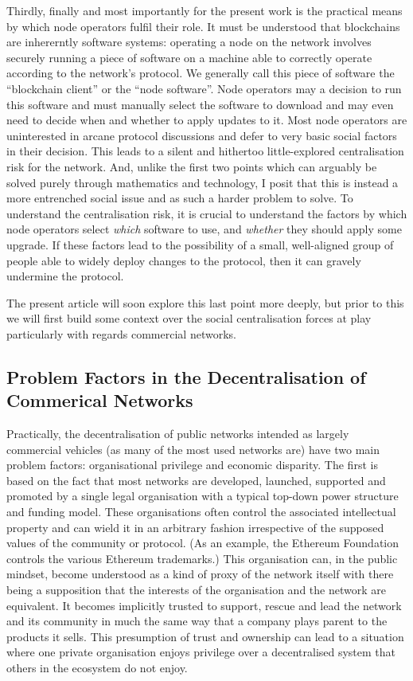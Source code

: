 \documentclass[9pt,oneside]{amsart}
\begin{document}
Thirdly, finally and most importantly for the present work is the practical means by which node operators fulfil their role. It must be understood that blockchains are inhererntly software systems: operating a node on the network involves securely running a piece of software on a machine able to correctly operate according to the network's protocol. We generally call this piece of software the ``blockchain client'' or the ``node software''. Node operators may a decision to run this software and must manually select the software to download and may even need to decide when and whether to apply updates to it. Most node operators are uninterested in arcane protocol discussions and defer to very basic social factors in their decision. This leads to a silent and hithertoo little-explored centralisation risk for the network. And, unlike the first two points which can arguably be solved purely through mathematics and technology, I posit that this is instead a more entrenched social issue and as such a harder problem to solve. To understand the centralisation risk, it is crucial to understand the factors by which node operators select \emph{which} software to use, and \emph{whether} they should apply some upgrade. If these factors lead to the possibility of a small, well-aligned group of people able to widely deploy changes to the protocol, then it can gravely undermine the protocol.

The present article will soon explore this last point more deeply, but prior to this we will first build some context over the social centralisation forces at play particularly with regards commercial networks.

\subsection{Problem Factors in the Decentralisation of Commerical Networks}

Practically, the decentralisation of public networks intended as largely commercial vehicles (as many of the most used networks are) have two main problem factors: organisational privilege and economic disparity. The first is based on the fact that most networks are developed, launched, supported and promoted by a single legal organisation with a typical top-down power structure and funding model. These organisations often control the associated intellectual property and can wield it in an arbitrary fashion irrespective of the supposed values of the community or protocol. (As an example, the Ethereum Foundation controls the various Ethereum trademarks.) This organisation can, in the public mindset, become understood as a kind of proxy of the network itself with there being a supposition that the interests of the organisation and the network are equivalent. It becomes implicitly trusted to support, rescue and lead the network and its community in much the same way that a company plays parent to the products it sells. This presumption of trust and ownership can lead to a situation where one private organisation enjoys privilege over a decentralised system that others in the ecosystem do not enjoy.
\end{document}
